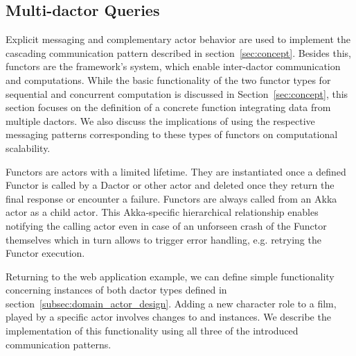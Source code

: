 \subsection[Multi-Dactor Queries]{Multi-\Gls{dactor} Queries}\label{subsec:multi_dactor_queries}

Explicit messaging and complementary actor behavior are used to implement the cascading communication pattern described in section~\ref{sec:concept}.
Besides this, \glspl{functor} are the framework's system, which enable inter-\gls{dactor} communication and computations.
While the basic functionality of the two \gls{functor} types for sequential and concurrent computation is discussed in Section~\ref{sec:concept}, this section focuses on the definition of a concrete function integrating data from multiple \glspl{dactor}.
We also discuss the implications of using the respective messaging patterns corresponding to these types of \glspl{functor} on computational scalability.

Functors are actors with a limited lifetime.
They are instantiated once a defined Functor is called by a Dactor or other actor and deleted once they return the final response or encounter a failure.
Functors are always called from an Akka actor as a child actor.
This Akka-specific hierarchical relationship enables notifying the calling actor even in case of an unforseen crash of the Functor themselves which in turn allows to trigger error handling, e.g. retrying the Functor execution.

Returning to the web application example, we can define simple functionality concerning instances of both \gls{dactor} types defined in section~\ref{subsec:domain_actor_design}.
Adding a new character role to a film, played by a specific actor involves changes to  and  instances.
We describe the implementation of this functionality using all three of the introduced communication patterns.


